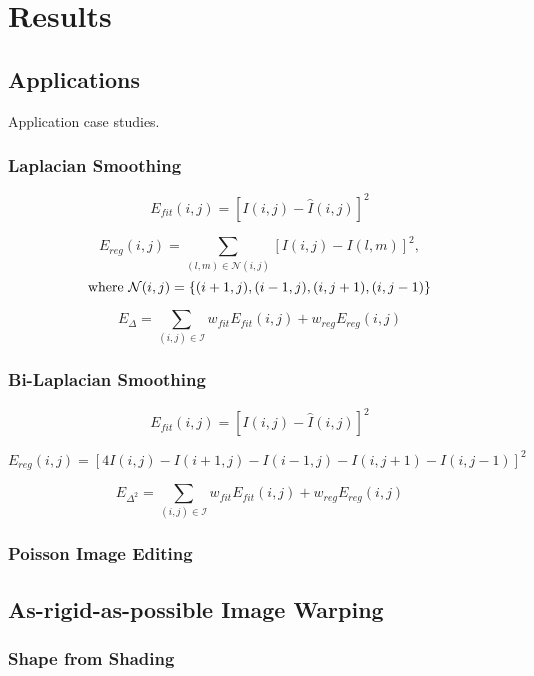 \section{Results}
\label{sec:results}

\subsection{Applications}
\label{sec:apps}
Application case studies.

\subsubsection{Laplacian Smoothing} 
$$E_{\mathit{fit}}(i,j) = [I(i,j) - \hat{I}(i,j) ]^2$$

$$E_{\mathit{reg}}(i,j) = \sum_{(l,m) \in \mathcal{N}(i,j)} [I(i,j) - I(l,m) ]^2,$$
$$\textnormal{where}\ \mathcal{N}(i,j) = \{(i+1,j), (i-1,j), (i,j+1), (i,j-1)\}$$

$$E_{\Delta} = \sum_{(i,j) \in \mathcal{I}} w_{\mathit{fit}} E_{\mathit{fit}}(i,j) + w_{\mathit{reg}} E_{\mathit{reg}}(i,j)$$

\subsubsection{Bi-Laplacian Smoothing}

$$E_{\mathit{fit}}(i,j) = [I(i,j) - \hat{I}(i,j) ]^2$$

$$E_{\mathit{reg}}(i,j) = [4 I(i,j) - I(i+1,j) - I(i-1,j) - I(i,j+1) - I(i,j-1)]^2$$

$$E_{\Delta^2} = \sum_{(i,j) \in \mathcal{I}} w_{\mathit{fit}} E_{\mathit{fit}}(i,j) + w_{\mathit{reg}} E_{\mathit{reg}}(i,j)$$

\subsubsection{Poisson Image Editing}

\cite{perez2003poisson}

\subsection{As-rigid-as-possible Image Warping}

\cite{sorkine2007rigid}

\cite{alexa2000rigid}

\subsubsection{Shape from Shading}

